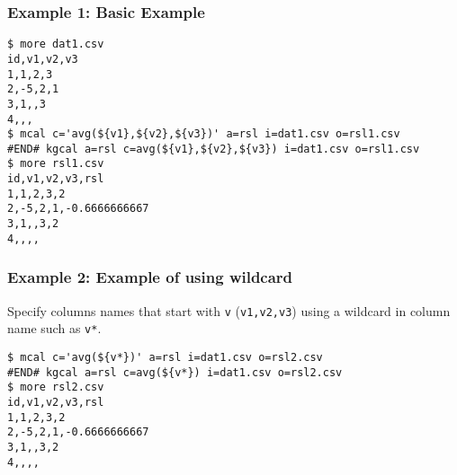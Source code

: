\subsubsection*{Example 1: Basic Example}



\begin{Verbatim}[baselinestretch=0.7,frame=single]
$ more dat1.csv
id,v1,v2,v3
1,1,2,3
2,-5,2,1
3,1,,3
4,,,
$ mcal c='avg(${v1},${v2},${v3})' a=rsl i=dat1.csv o=rsl1.csv
#END# kgcal a=rsl c=avg(${v1},${v2},${v3}) i=dat1.csv o=rsl1.csv
$ more rsl1.csv
id,v1,v2,v3,rsl
1,1,2,3,2
2,-5,2,1,-0.6666666667
3,1,,3,2
4,,,,
\end{Verbatim}
\subsubsection*{Example 2: Example of using wildcard}

Specify columns names that start with \verb|v| (\verb|v1,v2,v3|) using a wildcard in column name such as \verb|v*|.


\begin{Verbatim}[baselinestretch=0.7,frame=single]
$ mcal c='avg(${v*})' a=rsl i=dat1.csv o=rsl2.csv
#END# kgcal a=rsl c=avg(${v*}) i=dat1.csv o=rsl2.csv
$ more rsl2.csv
id,v1,v2,v3,rsl
1,1,2,3,2
2,-5,2,1,-0.6666666667
3,1,,3,2
4,,,,
\end{Verbatim}
